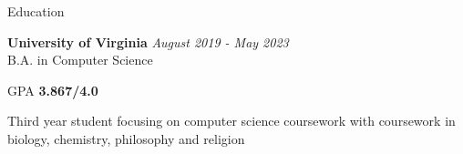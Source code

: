 \documentclass{resume}
\begin{document}

\begin{rSection}{Education}

    {\bf University of Virginia} \hfill {\em August 2019 - May 2023} \\ 
    B.A. in Computer Science

    GPA {\bf3.867/4.0}

    Third year student focusing on computer science coursework with coursework in biology, chemistry, philosophy and religion
\end{rSection}

\end{document}
